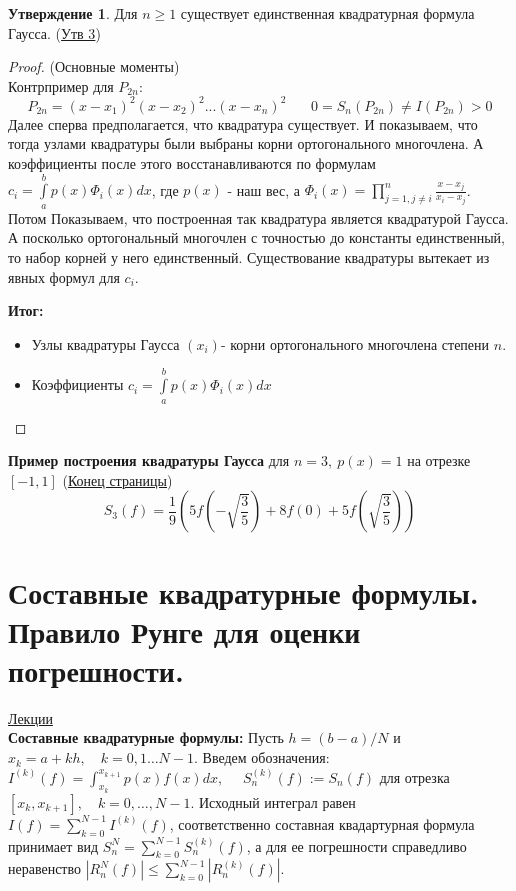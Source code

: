 \documentclass[specialist, subf, href, colorlinks=true, 12pt, times, mtpro, final]{disser}
\theoremstyle{definition}
\newtheorem{state}{Утверждение}[section]
\begin{document}
    \begin{state}
        Для $n \ge 1$ существует единственная квадратурная формула Гаусса. (\hyperlink {lects.42}{Утв 3})
    \end{state}
    \begin{proof} (Основные моменты) \\
        Контрпример для $P_{2n}$:
        $$
            P_{2n} = (x-x_1)^2 (x-x_2)^2 ... (x-x_n)^2 \ \ \ \ \ \ \ \ 0=S_n(P_{2n}) \ne I(P_{2n}) > 0
        $$
        Далее сперва предполагается, что квадратура существует. И показываем, что тогда узлами квадратуры были выбраны корни ортогонального многочлена.
        А коэффициенты после этого восстанавливаются по формулам $c_i = \int\limits_a^b p(x)\Phi_i(x)dx$, где $p(x)$ - наш вес, а $\Phi_i(x) = \prod\limits_{j = 1, j\ne i}^n \frac{x-x_j}{x_i-x_j}$. \\
        Потом Показываем, что построенная так квадратура является квадратурой Гаусса.\\
        А посколько ортогональный многочлен с точностью до константы единственный, то набор корней у него единственный. Существование квадратуры вытекает из явных формул для $c_i$.
        
        \textbf{Итог:}
        \begin{itemize}
            \item Узлы квадратуры Гаусса $(x_i)$- корни ортогонального многочлена степени $n$.
            \item Коэффициенты  $c_i = \int\limits_a^b p(x)\Phi_i(x)dx$
        \end{itemize}
        
    \end{proof}
    \noindent\textbf{Пример построения квадратуры Гаусса} для $n=3, \ p(x) = 1$ на отрезке $[-1,1]$ (\hyperlink {lects.42}{Конец страницы}) 
    $$
        S_3(f) = \frac{1}{9} \left( 5f\left( -\sqrt{\frac{3}{5}} \right) + 8f(0) + 5f\left( \sqrt{\frac{3}{5}} \right) \right)
    $$

\section {Составные квадратурные формулы. Правило Рунге для оценки погрешности.}
    \hyperlink {lects.44}{Лекции}\\
    \textbf{Составные квадратурные формулы:}
    Пусть $h = (b-a)/N$ и $x_k = a + kh, \quad k = 0, 1 \ldots N-1$. Введем обозначения: $I^{(k)}(f) = \int_{x_k}^{x_{k+1}} p(x)f(x)dx,$ $\quad S^{(k)}_n(f) := S_n(f)$ для отрезка $[x_k, x_{k+1}], \quad k = 0, \ldots, N-1$. Исходный интеграл равен $I(f) = \sum_{k=0}^{N-1}I^{(k)}(f)$, соответственно составная квадартурная формула принимает вид $S^N_n = \sum_{k=0}^{N-1} S_n^{(k)}(f)$, а для ее погрешности справедливо неравенство $|R_n^N(f)| \leq \sum_{k=0}^{N-1}|R_n^{(k)}(f)|$.
    
\end{document}
